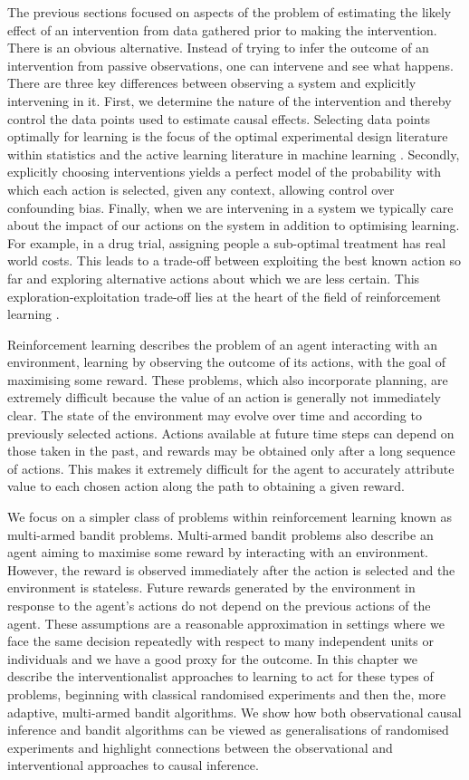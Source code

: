 \documentclass[11pt,a4paper,twoside]{report}
\theoremstyle{plain}
\theoremstyle{definition}
\begin{document}
The previous sections focused on aspects of the problem of estimating the likely effect of an intervention from data gathered prior to making the intervention. There is an obvious alternative. Instead of trying to infer the outcome of an intervention from passive observations, one can intervene and see what happens. There are three key differences between observing a system and explicitly intervening in it. First, we determine the nature of the intervention and thereby control the data points used to estimate causal effects. Selecting data points optimally for learning is the focus of the optimal experimental design literature within statistics \citep{pukelsheim2006optimal} and the active learning literature in machine learning \citep{settles2010active}. Secondly, explicitly choosing interventions yields a perfect model of the probability with which each action is selected, given any context, allowing control over confounding bias. Finally, when we are intervening in a system we typically care about the impact of our actions on the system in addition to optimising learning. For example, in a drug trial, assigning people a sub-optimal treatment has real world costs. This leads to a trade-off between exploiting the best known action so far and exploring alternative actions about which we are less certain. This exploration-exploitation trade-off lies at the heart of the field of reinforcement learning \citep{sutton1998reinforcement}.

Reinforcement learning describes the problem of an agent interacting with an environment, learning by observing the outcome of its actions, with the goal of maximising some reward. These problems, which also incorporate planning, are extremely difficult because the value of an action is generally not immediately clear. The state of the environment may evolve over time and according to previously selected actions. Actions available at future time steps can depend on those taken in the past, and rewards may be obtained only after a long sequence of actions. This makes it extremely difficult for the agent to accurately attribute value to each chosen action along the path to obtaining a given reward. 

We focus on a simpler class of problems within reinforcement learning known as multi-armed bandit problems. Multi-armed bandit problems also describe an agent aiming to maximise some reward by interacting with an environment. However, the reward is observed immediately after the action is selected and the environment is stateless. Future rewards generated by the  environment in response to the agent's actions do not depend on the previous actions of the agent. These assumptions are a reasonable approximation in settings where we face the same decision repeatedly with respect to many independent units or individuals and we have a good proxy for the outcome. In this chapter we describe the interventionalist approaches to learning to act for these types of problems, beginning with classical randomised experiments and then the, more adaptive, multi-armed bandit algorithms. We show how both observational causal inference and bandit algorithms can be viewed as generalisations of randomised experiments and highlight connections between the observational and interventional approaches to causal inference.
\end{document}
